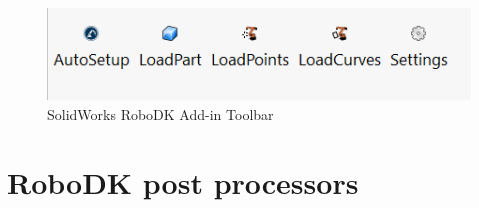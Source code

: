 \begin{figure}[h]
    \centering
    \includegraphics[width=0.6\linewidth]{img/solidworks_toolbar.PNG}
    \caption{SolidWorks RoboDK Add-in Toolbar}
    \label{fig:solidworkstoolbar}
\end{figure}

\section{RoboDK post processors}

